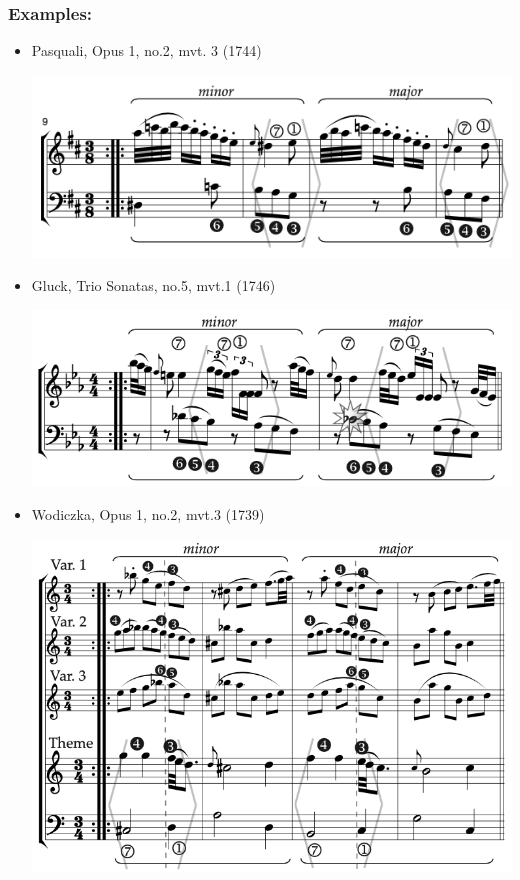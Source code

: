 ﻿\documentclass[11pt, openany]{article}
\begin{document}
\subsubsection{Examples:}
\begin{itemize}
\item Pasquali, Opus 1, no.2, mvt. 3 (1744)
\begin{center}
\includegraphics[scale=0.5]{pasquali1.png}
\end{center}
\item Gluck, Trio Sonatas, no.5, mvt.1 (1746)
\begin{center}
\includegraphics[scale=0.5]{gluck5.png}
\end{center}
\item Wodiczka, Opus 1, no.2, mvt.3 (1739)
\begin{center}
\includegraphics[scale=0.5]{wodiczka1.png}
\end{center}
\end{itemize}
\end{document}
